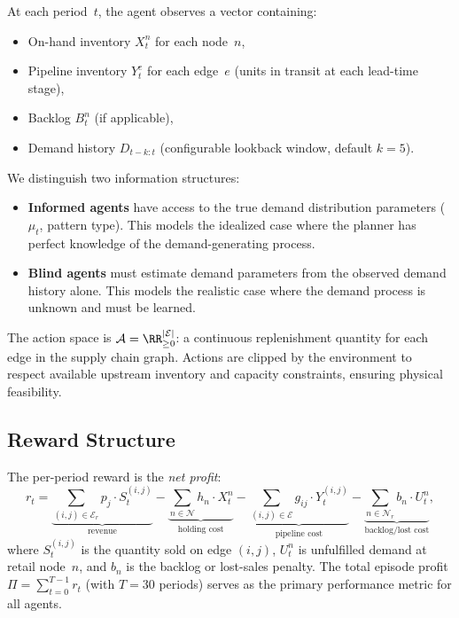 At each period~$t$, the agent observes a vector containing:
\begin{itemize}
  \item On-hand inventory $X_t^n$ for each node~$n$,
  \item Pipeline inventory $Y_t^e$ for each edge~$e$ (units in transit
        at each lead-time stage),
  \item Backlog $B_t^n$ (if applicable),
  \item Demand history $D_{t-k:t}$ (configurable lookback window,
        default $k = 5$).
\end{itemize}

We distinguish two information structures:
\begin{itemize}
  \item \textbf{Informed agents} have access to the true demand
        distribution parameters ($\mu_t$, pattern type). This models
        the idealized case where the planner has perfect knowledge of
        the demand-generating process.
  \item \textbf{Blind agents} must estimate demand parameters from
        the observed demand history alone. This models the realistic
        case where the demand process is unknown and must be learned.
\end{itemize}

The action space is $\mathcal{A} = \RR_{\geq 0}^{|\mathcal{E}|}$:
a continuous replenishment quantity for each edge in the supply chain
graph. Actions are clipped by the environment to respect available
upstream inventory and capacity constraints, ensuring physical
feasibility.

\subsection{Reward Structure}

The per-period reward is the \emph{net profit}:
\begin{equation}\label{eq:reward}
  r_t = \underbrace{\sum_{(i,j) \in \mathcal{E}_r} p_j \cdot S_t^{(i,j)}}
          _{\text{revenue}}
      - \underbrace{\sum_{n \in \mathcal{N}} h_n \cdot X_t^n}
          _{\text{holding cost}}
      - \underbrace{\sum_{(i,j) \in \mathcal{E}} g_{ij} \cdot Y_t^{(i,j)}}
          _{\text{pipeline cost}}
      - \underbrace{\sum_{n \in \mathcal{N}_r} b_n \cdot U_t^n}
          _{\text{backlog/lost cost}},
\end{equation}
where $S_t^{(i,j)}$ is the quantity sold on edge $(i,j)$, $U_t^n$ is
unfulfilled demand at retail node~$n$, and $b_n$ is the backlog or
lost-sales penalty. The total episode profit
$\Pi = \sum_{t=0}^{T-1} r_t$ (with $T = 30$ periods) serves as the
primary performance metric for all agents.

